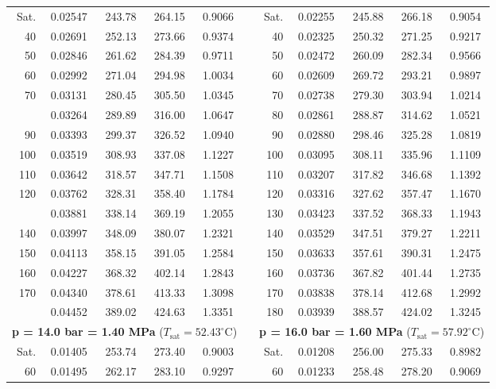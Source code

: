 \documentclass[12pt,a3paper]{article}
\begin{document}
\begin{enumerate}
\begin{center}
\begin{tabular}{r c c c c p{0.2cm} r c c c c}
\cmidrule(lr){1-5} \cmidrule(lr){7-11}
Sat. & 0.02547 & 243.78 & 264.15 & 0.9066 & & Sat. & 0.02255 & 245.88 & 266.18 & 0.9054 \\
40 & 0.02691 & 252.13 & 273.66 & 0.9374 & & 40 & 0.02325 & 250.32 & 271.25 & 0.9217 \\
50 & 0.02846 & 261.62 & 284.39 & 0.9711 & & 50 & 0.02472 & 260.09 & 282.34 & 0.9566 \\
60 & 0.02992 & 271.04 & 294.98 & 1.0034 & & 60 & 0.02609 & 269.72 & 293.21 & 0.9897 \\
70 & 0.03131 & 280.45 & 305.50 & 1.0345 & & 70 & 0.02738 & 279.30 & 303.94 & 1.0214 \\ \addlinespace
80 & 0.03264 & 289.89 & 316.00 & 1.0647 & & 80 & 0.02861 & 288.87 & 314.62 & 1.0521 \\
90 & 0.03393 & 299.37 & 326.52 & 1.0940 & & 90 & 0.02880 & 298.46 & 325.28 & 1.0819 \\
100 & 0.03519 & 308.93 & 337.08 & 1.1227 & & 100 & 0.03095 & 308.11 & 335.96 & 1.1109 \\
110 & 0.03642 & 318.57 & 347.71 & 1.1508 & & 110 & 0.03207 & 317.82 & 346.68 & 1.1392 \\
120 & 0.03762 & 328.31 & 358.40 & 1.1784 & & 120 & 0.03316 & 327.62 & 357.47 & 1.1670 \\ \addlinespace
130 & 0.03881 & 338.14 & 369.19 & 1.2055 & & 130 & 0.03423 & 337.52 & 368.33 & 1.1943 \\
140 & 0.03997 & 348.09 & 380.07 & 1.2321 & & 140 & 0.03529 & 347.51 & 379.27 & 1.2211 \\
150 & 0.04113 & 358.15 & 391.05 & 1.2584 & & 150 & 0.03633 & 357.61 & 390.31 & 1.2475 \\
160 & 0.04227 & 368.32 & 402.14 & 1.2843 & & 160 & 0.03736 & 367.82 & 401.44 & 1.2735 \\
170 & 0.04340 & 378.61 & 413.33 & 1.3098 & & 170 & 0.03838 & 378.14 & 412.68 & 1.2992 \\ \addlinespace
180 & 0.04452 & 389.02 & 424.63 & 1.3351 & & 180 & 0.03939 & 388.57 & 424.02 & 1.3245 \\
\midrule[\lightrulewidth]
\multicolumn{5}{c}{\textbf{p = 14.0 bar = 1.40 MPa} ($T_{\text{sat}} = 52.43^\circ\text{C}$)} & & \multicolumn{5}{c}{\textbf{p = 16.0 bar = 1.60 MPa} ($T_{\text{sat}} = 57.92^\circ\text{C}$)} \\
\cmidrule(lr){1-5} \cmidrule(lr){7-11}
Sat. & 0.01405 & 253.74 & 273.40 & 0.9003 & & Sat. & 0.01208 & 256.00 & 275.33 & 0.8982 \\
60 & 0.01495 & 262.17 & 283.10 & 0.9297 & & 60 & 0.01233 & 258.48 & 278.20 & 0.9069 \\

\end{tabular}
\end{center}
\end{enumerate}
\end{document}
